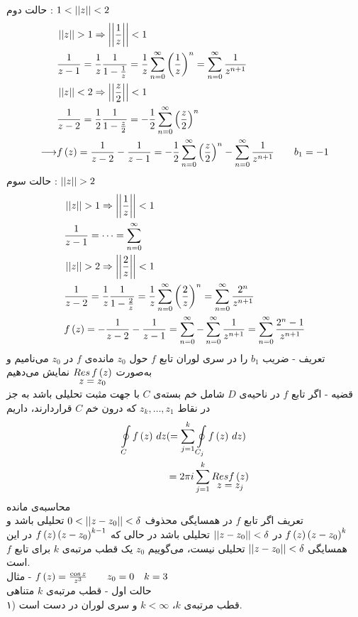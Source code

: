 حالت دوم : 
$1<\norm z<2$
\[\begin{aligned}
	&
	\norm z>1\Rightarrow \norm{\frac1z}<1
	\\ &
	\frac1{z-1}=\frac1z\frac1{1-\frac1z}=\frac1z\sum_{n=0}^\infty\pr{\frac1z}^n=\sum_{n=0}^\infty\frac1{z^{n+1}}
	\\ &
	\norm{z}<2\Rightarrow \norm{\frac z2}<1
	\\ &
	\frac1{z-2}=\frac12\frac1{1-\frac z2}=-\frac12\sum_{n=0}^\infty\pr{\frac z2}^n
	\\ \longrightarrow &
	f\pr z=\frac1{z-2}-\frac1{z-1}=-\frac12\sum_{n=0}^\infty\pr{\frac z2}^n-\sum_{n=0}^\infty \frac 1{z^{n+1}}\qquad b_1=-1
\end{aligned}\]
حالت سوم :
$\norm z>2$
\[\begin{aligned}
	&
	\norm z>1\Rightarrow \norm{\frac 1z}<1
	\\ &
	\frac1{z-1}=\dots=\sum_{n=0}^\infty
	\\ &
	\norm z>2\Rightarrow\norm{\frac2z}<1
	\\ &
	\frac1{z-2}=\frac1z\frac1{1-\frac2z}=\frac1z\sum_{n=0}^\infty\pr{\frac2z}^n=\sum_{n=0}^\infty\frac{2^n}{z^{n+1}}
	\\ &
	f\pr{z}=-\frac1{z-2}-\frac1{z-1}=\sum_{n=0}^\infty-\sum_{n=0}^\infty\frac1{z^{n+1}}=\sum_{n=0}^\infty\frac{2^n-1}{z^{n+1}}
\end{aligned}\]
تعریف - ضریب $b_1$ را در سری لوران تابع
$f$
حول
$z_0$
مانده‌ی
$f$
در
$z_0$
می‌نامیم و به‌صورت
$\myunder{Res\, f\pr z}{z=z_0}$
نمایش می‌دهیم\\
قضیه - اگر تابع
$f$
در ناحیه‌ی
$D$
شامل خم بسته‌ی
$C$
با جهت مثبت تحلیلی باشد به جز در نقاط
$z_k,\dots,z_1$
که درون خم
$C$
قراردارند، داریم
\[\begin{aligned}
\oint\limits_Cf\pr z\,dz &(=\sum_{j=1}^k\oint\limits_{C_j}f\pr z\,dz)
\\ &
=2\pi i\sum_{j=1}^k \myunder{Res f\pr z}{z=z_j}
\end{aligned}\]
محاسبه‌ی مانده\\
تعریف اگر تابع
$f$
در همسایگی محذوف
$0<\norm{z-z_0}<\delta$
تحلیلی باشد و
$f\pr{z}\pr{z-z_0}^k$
در
$\norm{z-z_0}<\delta$
تحلیلی باشد در حالی که
$f\pr z\pr{z-z_0}^{k-1}$
در این همسایگی
$\norm{z-z_0}<\delta$
تحلیلی نیست، می‌گوییم
$z_0$
یک قطب مرتبه‌ی
$k$
برای تابع
$f$
است.\\
مثال - \hfill
$f\pr z=\frac{\cos z}{z^3}\qquad z_0=0\quad k=3$\\
حالت اول - قطب مرتبه‌ی
$k$
متناهی\\
۱) قطب مرتبه‌ی
$k$،
$k<\infty$
و سری لوران در دست است.

